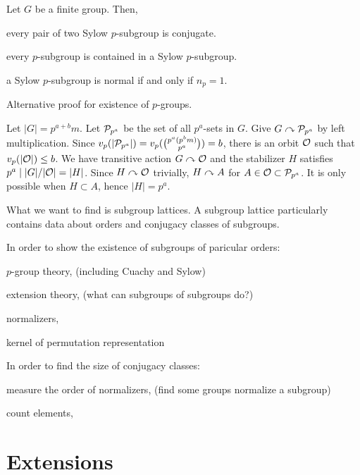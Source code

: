 \documentclass{../exp}
\begin{document}
\begin{cor}
Let $G$ be a finite group.
Then,
\begin{cond}
\item every pair of two Sylow $p$-subgroup is conjugate.
\item every $p$-subgroup is contained in a Sylow $p$-subgroup.
\item a Sylow $p$-subgroup is normal if and only if $n_p=1$.
\end{cond}
\end{cor}

\begin{thm}
Alternative proof for existence of $p$-groups.
\end{thm}
\begin{pf}
Let $|G|=p^{a+b}m$.
Let $\mathcal{P}_{p^a}$ be the set of all $p^a$-sets in $G$.
Give $G\curvearrowright\mathcal{P}_{p^a}$ by left multiplication.
Since $v_p(|\mathcal{P}_{p^a}|)=v_p({p^a(p^bm)\choose p^a})=b$, there is an orbit $\mathcal{O}$ such that $v_p(|\mathcal{O}|)\le b$.
We have transitive action $G\curvearrowright\mathcal{O}$ and the stabilizer $H$ satisfies $p^a\mid|G|/|\mathcal{O}|=|H|$.
Since $H\curvearrowright\mathcal{O}$ trivially, $H\curvearrowright A$ for $A\in\mathcal{O}\subset\mathcal{P}_{p^a}$.
It is only possible when $H\subset A$, hence $|H|=p^a$.
\end{pf}


What we want to find is subgroup lattices.
A subgroup lattice particularly contains data about orders and conjugacy classes of subgroups.

In order to show the existence of subgroups of paricular orders:
\begin{cond}
\item $p$-group theory, (including Cuachy and Sylow)
\item extension theory, (what can subgroups of subgroups do?)
\item normalizers,
\item kernel of permutation representation
\end{cond}

In order to find the size of conjugacy classes:
\begin{cond}
\item measure the order of normalizers, (find some groups normalize a subgroup)
\item count elements,
\end{cond}



\section{Extensions}
\end{document}
